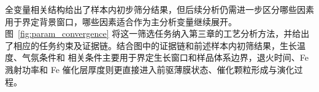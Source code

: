 \newcommand{\kgchaincard}[3]{%
    {%
        \renewcommand{\arraystretch}{1.02}%
        \renewcommand{\tabularxcolumn}[1]{m{##1}}%
        \setlength{\tabcolsep}{2pt}%
        \noindent\begin{tabularx}{\linewidth}{@{}>{\raggedright\arraybackslash}m{0.18\linewidth}@{\hspace{0.55em}}>{\raggedright\arraybackslash}X@{}}
            {\color{kgEvidenceTag}\bfseries #1} & #2 \\[0.08em]
            {\color{black!58}\bfseries 文献支撑} & {\color{black!58}#3} \\
        \end{tabularx}\par
    }%
    {\color{kgRule}\rule{\linewidth}{0.35pt}}\par\smallskip
}
\newcommand{\kgresult}[1]{%
    \setlength{\fboxsep}{6pt}%
    \noindent\colorbox{kgResultBg}{%
        \parbox{\dimexpr\linewidth-2\fboxsep\relax}{%
\textbf{归纳结果} #1%
        }%
    }\par
}
\newcommand{\kgpanel}[3]{%
    \setlength{\fboxsep}{8pt}%
    \noindent\fcolorbox{black!12}{#2}{%
        \parbox{\dimexpr\linewidth-2\fboxsep-2\fboxrule\relax}{%
            {\color{#3}\bfseries #1}\par\medskip
        }%
    }%
}
\newcommand{\kgpanelcontent}[2]{%
    \setlength{\fboxsep}{8pt}%
    \noindent\fcolorbox{black!12}{#1}{%
        \parbox{\dimexpr\linewidth-2\fboxsep-2\fboxrule\relax}{#2}%
    }\par
}

全变量相关结构给出了样本内初步筛分结果，但后续分析仍需进一步区分哪些因素用于界定背景窗口，哪些因素适合作为主分析变量继续展开。图~\ref{fig:param_convergence} 将这一筛选任务纳入第三章的工艺分析方法，并给出了相应的任务约束及证据链。结合图中的证据链和前述样本内初筛结果，生长温度、气氛条件和  相关条件主要用于界定生长窗口和样品体系边界，退火时间、Fe 溅射功率和 Fe 催化层厚度则更直接进入前驱薄膜状态、催化颗粒形成与演化过程。

